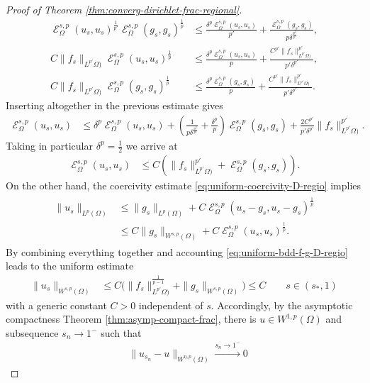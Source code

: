 \documentclass[10pt,a4paper]{amsart}
\DeclareMathOperator{\cE}{\mathcal{E}}
\begin{document}
\begin{proof}[Proof of Theorem \ref{thm:converg-dirichlet-frac-regional}]
\begin{align*}
\cE^{s,p}_\Omega(u_s,u_s)^{\frac{1}{p'}}\cE^{s,p}_\Omega(g_s,g_s)^{\frac{1}{p}}
&\leq  \frac{\delta^{p}\cE^{s,p}_\Omega(u_s,u_s)}{p'}+ \frac{\cE^{s,p}_\Omega(g_s,g_s)}{p\delta^{\frac{p^2}{p'}}},\\
%
C\|f_s\|_{L^{p'}\Omega)} \cE^{s,p}_\Omega(u_s,u_s)^{\frac{1}{p}}
&\leq  \frac{\delta^p\cE^{s,p}_\Omega(u_s,u_s)}{p}+ \frac{C^{p'}\|f_s\|_{L^{p'}\Omega)} ^{p'}}{p'\delta^{p'}},\\
%
C\|f_s\|_{L^{p'}\Omega)}\cE^{s,p}_\Omega(g_s,g_s)^{\frac{1}{p}}
&\leq \frac{\delta^{p}\cE^{s,p}_\Omega(g_s,g_s)}{p} + \frac{C^{p'}\|f_s\|_{L^{p'}\Omega)} ^{p'}}{p'\delta^{p'}}.
\end{align*}
Inserting altogether in the previous estimate gives
\begin{align*}
\cE^{s,p}_\Omega(u_s,u_s)
&\leq 	 \delta^{p}\cE^{s,p}_\Omega(u_s,u_s) + ( \frac{1}{p\delta^{\frac{p^2}{p'}}}+ \frac{\delta^{p}}{p}) \cE^{s,p}_\Omega(g_s,g_s)
+ \frac{2C^{p'}}{p'\delta^{p'}} \|f_s\|_{L^{p'}\Omega)} ^{p'}.
\end{align*}
\noindent Taking in particular  $\delta^p=\frac12$ we arrive at
\begin{align*}
\cE^{s,p}_\Omega(u_s,u_s)&\leq C(\|f_s\|_{L^{p'}\Omega)} ^{p'} + \cE^{s,p}_\Omega(g_s,g_s)) .
\end{align*}
On the other hand, the coercivity estimate \eqref{eq:uniform-coercivity-D-regio} implies
\begin{align}\label{eq:xlp-bound-dirich}
\begin{split}
\|u_s\|_{L^p(\Omega)}
&\leq  \|g_s\|_{L^p(\Omega)}+ C\cE^{s,p}_\Omega(u_s-g_s,u_s-g_s)^{\frac{1}{p}}\\
&\leq C\|g_s\|_{W^{s,p}(\Omega) }+ C\cE^{s,p}_\Omega(u_s,u_s)^{\frac{1}{p}}.
\end{split}
\end{align}
By combining everything together and accounting \eqref{eq:uniform-bdd-f-g-D-regio}  leads to the uniform estimate
\begin{align}\label{eq:unifo-bdedness-D}
\|u_s\|_{W^{s,p}(\Omega)}
&\leq C\big(\|f_s \|^{\frac{1}{p-1}}_{L^{p'}\Omega)}+\|g_s \|_{W^{s,p}(\Omega)}\big)
\leq C \qquad s\in (s_*,1)
\end{align}
with  a generic  constant  $C>0$ independent of $s$. Accordingly, by the asymptotic compactness
Theorem \ref{thm:asymp-compact-frac}, there is $u\in W^{1,p}(\Omega)$ and subsequence $s_n\to 1^-$ such that
\begin{align*}
&\|u_{s_n} -u\|_{W^{\eta,p}(\Omega)}\xrightarrow{s_n\to 1^-}0

\end{align*}
\end{proof}
\end{document}
